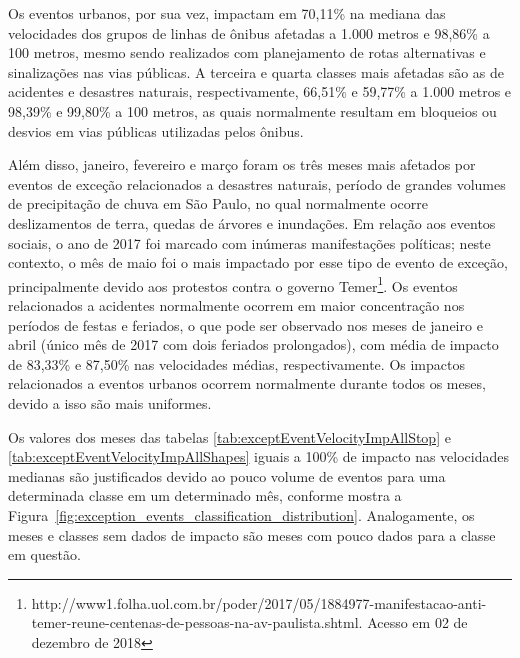 \documentclass[
	12pt,				%
	oneside,			%
	a4paper,			%
	english,			%
	brazil				%
	]{abntex2ppgsi}
\begin{document}
{{Os eventos urbanos, por sua vez, impactam em 70,11\% na mediana das velocidades dos grupos de linhas de ônibus afetadas a 1.000 metros e 98,86\% a 100 metros, mesmo sendo realizados com planejamento de rotas alternativas e sinalizações nas vias públicas. A terceira e quarta classes mais afetadas são as de acidentes e desastres naturais, respectivamente, 66,51\% e 59,77\% a 1.000 metros e 98,39\% e 99,80\% a 100 metros, as quais normalmente resultam em bloqueios ou desvios em vias públicas utilizadas pelos ônibus.

Além disso, janeiro, fevereiro e março foram os três meses mais afetados por eventos de exceção relacionados a desastres naturais, período de grandes volumes de precipitação de chuva em São Paulo, no qual normalmente ocorre deslizamentos de terra, quedas de árvores e inundações.  Em relação aos eventos sociais, o ano de 2017 foi marcado com inúmeras manifestações políticas; neste contexto, o mês de maio foi o mais impactado por esse tipo de evento de exceção, principalmente devido aos protestos contra o governo Temer\footnote{{http://www1.folha.uol.com.br/poder/2017/05/1884977-manifestacao-anti-temer-reune-centenas-de-pessoas-na-av-paulista.shtml}. Acesso em 02 de dezembro de 2018}. Os eventos relacionados a acidentes normalmente ocorrem em maior concentração nos períodos de festas e feriados, o que pode ser observado nos meses de janeiro e abril (único mês de 2017 com dois feriados prolongados), com média de impacto de 83,33\% e 87,50\% nas velocidades médias, respectivamente.  Os impactos relacionados a eventos urbanos ocorrem normalmente durante todos os meses, devido a isso são mais uniformes.

Os valores dos meses das tabelas \ref{tab:exceptEventVelocityImpAllStop} e \ref{tab:exceptEventVelocityImpAllShapes} iguais a 100\% de impacto nas velocidades medianas são justificados devido ao pouco volume de eventos para uma determinada classe em um determinado mês, conforme mostra a Figura~\ref{fig:exception_events_classification_distribution}. Analogamente, os meses e classes sem dados de impacto são meses com pouco dados para a classe em questão.

}}
\end{document}
